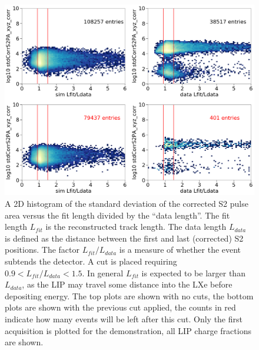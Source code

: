 \begin{figure}[htbp]
\begin{center}
\includegraphics[width=\textwidth]{figures/lips/cut2.png}
\caption{ A 2D histogram of the standard deviation of the corrected S2 pulse area versus the fit length divided by the ``data length''. The fit length $L_{fit}$ is the reconstructed track length. The data length $L_{data}$ is defined as the distance between the first and last (corrected) S2 positions. The factor $L_{fit}/L_{data}$ is a measure of whether the event subtends the detector. A cut is placed requiring  $0.9 < L_{fit}/L_{data}< 1.5$. In general $L_{fit}$ is expected to be larger than $L_{data}$, as the \acs{LIP} may travel some distance into the \acs{LXe} before depositing energy. The top plots are shown with no cuts, the bottom plots are shown with the previous cut applied, the counts in red indicate how many events will be left after this cut. Only the first acquisition is plotted for the demonstration, all \acs{LIP} charge fractions are shown.  }
\label{fig:cut2}
\end{center}
\end{figure}


